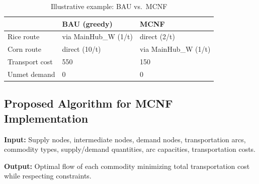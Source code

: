 \documentclass{icsthesis}
\begin{document}
\begin{mainmatter}
\begin{table}[H]
\caption{Illustrative example: BAU vs.\ MCNF}
\label{tab:toy_results}
\centering
\small
\setlength{\tabcolsep}{3pt}
\begin{tabular}{lll}
\hline
 & BAU (greedy) & MCNF \\
\hline
Rice route & via MainHub\_W (1/t) & direct (2/t) \\
Corn route & direct (10/t) & via MainHub\_W (1/t) \\
Transport cost & 550 & 150 \\
Unmet demand & 0 & 0 \\
\hline
\end{tabular}
\end{table}

\FloatBarrier

\subsection{Proposed Algorithm for MCNF Implementation}
\textbf{Input:} Supply nodes, intermediate nodes, demand nodes, transportation arcs, commodity types, supply/demand quantities, arc capacities, transportation costs.  

\textbf{Output:} Optimal flow of each commodity minimizing total transportation cost while respecting constraints.


\end{mainmatter}
\end{document}
